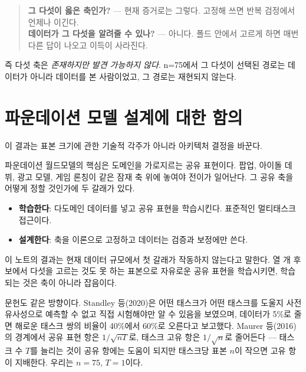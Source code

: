 \documentclass[10pt]{article}
\begin{document}
\begin{quote}\fontsize{9.2}{11}\selectfont
\textbf{그 다섯이 옳은 축인가?} --- 현재 증거로는 그렇다. 고정해 쓰면 반복 검정에서
언제나 이긴다.\\[0.35em]
\textbf{데이터가 그 다섯을 알려줄 수 있나?} --- 아니다. 폴드 안에서 고르게 하면 매번
다른 답이 나오고 이득이 사라진다.
\end{quote}

즉 다섯 축은 \emph{존재하지만 발견 가능하지 않다}. n=75에서 그 다섯이 선택된 경로는
데이터가 아니라 데이터를 본 사람이었고, 그 경로는 재현되지 않는다.


\section{파운데이션 모델 설계에 대한 함의}

이 결과는 표본 크기에 관한 기술적 각주가 아니라 아키텍처 결정을 바꾼다.

파운데이션 월드모델의 핵심은 도메인을 가로지르는 공유 표현이다. 팝업, 아이돌 데뷔,
광고 모델, 게임 론칭이 같은 잠재 축 위에 놓여야 전이가 일어난다. 그 공유 축을 어떻게
정할 것인가에 두 갈래가 있다.

\begin{itemize}[leftmargin=1.1em,itemsep=0.15em]
\item \textbf{학습한다}: 다도메인 데이터를 넣고 공유 표현을 학습시킨다. 표준적인
      멀티태스크 접근이다.
\item \textbf{설계한다}: 축을 이론으로 고정하고 데이터는 검증과 보정에만 쓴다.
\end{itemize}

이 노트의 결과는 현재 데이터 규모에서 첫 갈래가 작동하지 않는다고 말한다. 열 개
후보에서 다섯을 고르는 것도 못 하는 표본으로 자유로운 공유 표현을 학습시키면, 학습되는
것은 축이 아니라 잡음이다.

문헌도 같은 방향이다. Standley 등(2020)은 어떤 태스크가 어떤 태스크를 도울지 사전
유사성으로 예측할 수 없고 직접 시험해야만 알 수 있음을 보였으며, 데이터가 5\%로 줄면
해로운 태스크 쌍의 비율이 40\%에서 60\%로 오른다고 보고했다. Maurer 등(2016)의
경계에서 공유 표현 항은 $1/\sqrt{nT}$로, 태스크 고유 항은 $1/\sqrt{n}$로 줄어든다 ---
태스크 수 $T$를 늘리는 것이 공유 항에는 도움이 되지만 태스크당 표본 $n$이 작으면
고유 항이 지배한다. 우리는 $n=75$, $T=1$이다.
\end{document}
